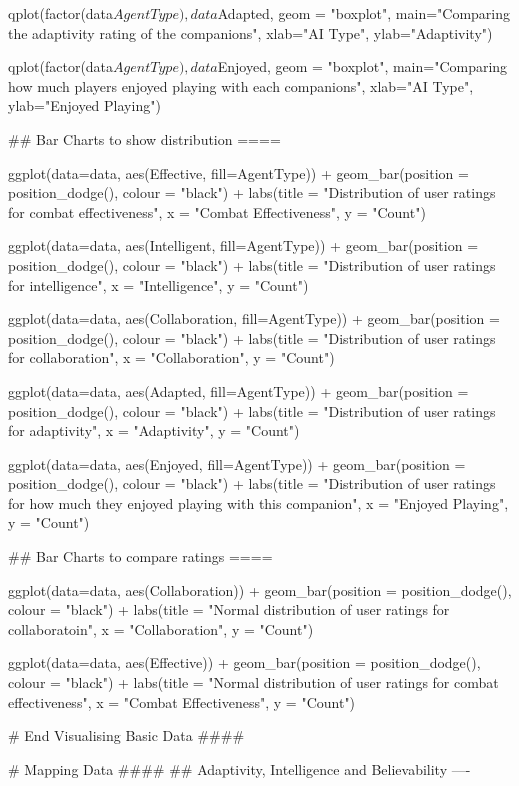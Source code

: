 \documentclass{IEEEtran}
\begin{document}
\begin{verbnobox}[\fontsize{10pt}{10pt}\selectfont]
qplot(factor(data$AgentType), data$Adapted, geom = "boxplot", 
      main="Comparing the adaptivity rating of the companions", 
      xlab="AI Type", ylab="Adaptivity")

qplot(factor(data$AgentType), data$Enjoyed, geom = "boxplot", 
      main="Comparing how much players enjoyed playing with each companions", 
      xlab="AI Type", ylab="Enjoyed Playing")


## Bar Charts to show distribution ====

ggplot(data=data, aes(Effective, fill=AgentType)) +
  geom_bar(position = position_dodge(), colour = "black") +
  labs(title = "Distribution of user ratings for combat effectiveness",
       x = "Combat Effectiveness", y = "Count")

ggplot(data=data, aes(Intelligent, fill=AgentType)) +
  geom_bar(position = position_dodge(), colour = "black") +
  labs(title = "Distribution of user ratings for intelligence",
       x = "Intelligence", y = "Count")

ggplot(data=data, aes(Collaboration, fill=AgentType)) +
  geom_bar(position = position_dodge(), colour = "black") +
  labs(title = "Distribution of user ratings for collaboration",
       x = "Collaboration", y = "Count")

ggplot(data=data, aes(Adapted, fill=AgentType)) +
  geom_bar(position = position_dodge(), colour = "black") +
  labs(title = "Distribution of user ratings for adaptivity",
       x = "Adaptivity", y = "Count")

ggplot(data=data, aes(Enjoyed, fill=AgentType)) +
  geom_bar(position = position_dodge(), colour = "black") +
  labs(title = "Distribution of user ratings for how much they enjoyed playing with this 
  companion",
       x = "Enjoyed Playing", y = "Count")

## Bar Charts to compare ratings ====

ggplot(data=data, aes(Collaboration)) +
  geom_bar(position = position_dodge(), colour = "black") +
  labs(title = "Normal distribution of user ratings for collaboratoin",
       x = "Collaboration", y = "Count")

ggplot(data=data, aes(Effective)) +
  geom_bar(position = position_dodge(), colour = "black") +
  labs(title = "Normal distribution of user ratings for combat effectiveness",
       x = "Combat Effectiveness", y = "Count")

# End Visualising Basic Data ####

# Mapping Data ####
## Adaptivity, Intelligence and Believability ----


\end{verbnobox}
\end{document}
